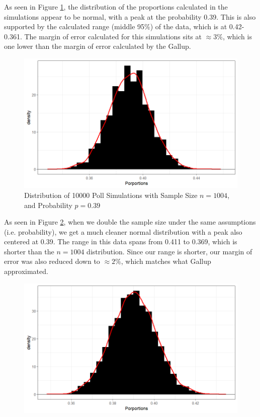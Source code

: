 \documentclass{article}\usepackage[]{graphicx}\usepackage[]{xcolor}
\begin{document}
\begin{multicols}{2}
As seen in Figure \hyperref[fig1]{1}, the distribution of the proportions calculated in the simulations appear to be normal, with a peak at the probability 0.39. This is also supported by the calculated range (middle 95\%) of the data, which is at 0.42-0.361. The margin of error calculated for this simulations sits at $\approx 3\%$, which is one lower than the margin of error calculated by the Gallup.

\begin{figure}[H]
  \centering
  \includegraphics[width=\columnwidth]{sample1004.png}
  \caption{Distribution of 10000 Poll Simulations with Sample Size $n = 1004$, and Probability $p = 0.39$}
  \label{fig1}
\end{figure}

As seen in Figure \hyperref[fig2]{2}, when we double the sample size under the same assumptions (i.e. probability), we get a much cleaner normal distribution with a peak also centered at 0.39. The range in this data spans from 0.411 to 0.369, which is shorter than the $n = 1004$ distribution. Since our range is shorter, our margin of error was also reduced down to $\approx 2\%$, which matches what Gallup approximated.

\begin{figure}[H]
  \centering
  \includegraphics[width=\columnwidth]{sample2008.png}
  \caption{}
  \label{Distribution of 10000 Poll Simulations with Sample Size $n = 2008$, and Probability $p = 0.39$}
\end{figure}


\end{multicols}
\end{document}
